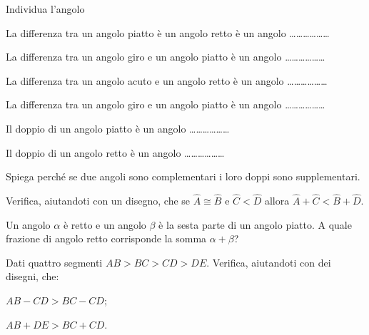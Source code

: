 \begin{esercizio}
\label{ese:1.78}
Individua l'angolo
\begin{enumeratea}
\item La differenza tra un angolo piatto è un angolo retto è un 
angolo \ldots\ldots\ldots\ldots\ldots\ldots{}
\item La differenza tra un angolo giro e un angolo piatto è un angolo 
\ldots\ldots\ldots\ldots\ldots\ldots{}
\item La differenza tra un angolo acuto e un angolo retto è un angolo 
\ldots\ldots\ldots\ldots\ldots\ldots{}
\item La differenza tra un angolo giro e un angolo piatto è un angolo 
\ldots\ldots\ldots\ldots\ldots\ldots{}
\item Il doppio di un angolo piatto è un angolo 
\ldots\ldots\ldots\ldots\ldots\ldots{}
\item Il doppio di un angolo retto è un angolo 
\ldots\ldots\ldots\ldots\ldots\ldots{}
\end{enumeratea}
\end{esercizio}
	
\begin{esercizio}
\label{ese:1.79}
Spiega perché se due angoli sono complementari i loro doppi sono 
supplementari.
\end{esercizio}

\begin{esercizio}
\label{ese:1.80}
Verifica, aiutandoti con un disegno, che se $\widehat{A}\cong 
\widehat{B}$ e $\widehat{C}<\widehat{D}$ allora 
$\widehat{A}+\widehat{C}<\widehat{B}+\widehat{D}$.
\end{esercizio}

\begin{esercizio}
\label{ese:1.81}
Un angolo $\alpha$ è retto e un angolo $\beta$ è la sesta parte di un 
angolo piatto. A quale frazione di angolo retto corrisponde la somma 
$\alpha + \beta$?
\end{esercizio}

\begin{esercizio}
\label{ese:1.82}
Dati quattro segmenti $AB>BC>CD>DE$. Verifica, aiutandoti con dei 
disegni, che:
\begin{multicols}{2}
\begin{enumeratea}
\item $AB-CD > BC-CD$;
\item $AB+DE > BC+CD$.
\end{enumeratea}
\end{multicols}
\end{esercizio}

